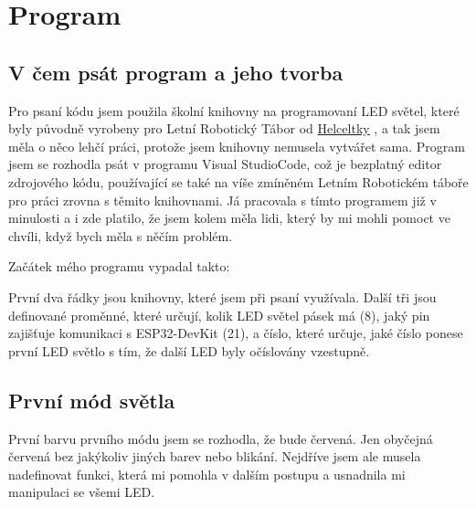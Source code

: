 \chapter{Program}

\section{V čem psát program a jeho tvorba}

Pro psaní kódu jsem použila školní knihovny na programovaní LED světel, které byly původně vyrobeny pro Letní Robotický Tábor od 
 \href{https://helceletka.cz/tabory/#id=5357}{Helceltky}
, a tak jsem měla o něco lehčí práci, protože jsem knihovny nemusela vytvářet sama. Program jsem se rozhodla psát v programu Visual StudioCode,\cite{Visualstudio} což je bezplatný editor zdrojového kódu, používající se také na víše zmíněném Letním Robotickém táboře pro práci zrovna s těmito knihovnami. Já pracovala s tímto programem již v minulosti a i zde platilo, že jsem kolem měla lidi, který by mi mohli pomoct ve chvíli, když bych měla s něčím problém. 

Začátek mého programu vypadal takto:




%



První dva řádky jsou knihovny, které jsem při psaní využívala. Další tři jsou definované proměnné, které určují, kolik LED světel pásek má (8), jaký pin zajišťuje komunikaci s ESP32-DevKit (21), a číslo, které určuje, jaké číslo ponese první LED světlo s tím, že další LED byly očíslovány vzestupně.

\newpage

\section{První mód světla}
První barvu prvního módu jsem se rozhodla, že bude červená. Jen obyčejná červená bez jakýkoliv jiných barev nebo blikání. Nejdříve jsem ale musela nadefinovat funkci, která mi pomohla v dalším postupu a usnadnila mi manipulaci se všemi LED. 

%



